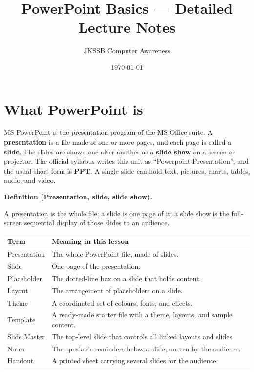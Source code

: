 \documentclass[11pt]{article}
\title{PowerPoint Basics --- Detailed Lecture Notes}
\author{JKSSB Computer Awareness}
\date{\today}
\newenvironment{definitionbox}[1]{%
  \par\noindent\textbf{Definition (#1).}\ \itshape
}{\par\vspace{0.3em}}
\begin{document}
\maketitle

\section{What PowerPoint is}
MS PowerPoint is the presentation program of the MS Office suite. A
\textbf{presentation} is a file made of one or more pages, and each page is
called a \textbf{slide}. The slides are shown one after another as a
\textbf{slide show} on a screen or projector. The official syllabus writes
this unit as ``Powerpoint Presentation'', and the usual short form is
\textbf{PPT}. A single slide can hold text, pictures, charts, tables, audio,
and video.

\begin{definitionbox}{Presentation, slide, slide show}
A presentation is the whole file; a slide is one page of it; a slide show is
the full-screen sequential display of those slides to an audience.
\end{definitionbox}

\begin{center}
\begin{tabular}{p{}p{}}
\toprule
\textbf{Term} & \textbf{Meaning in this lesson} \\
\midrule
Presentation & The whole PowerPoint file, made of slides. \\
Slide & One page of the presentation. \\
Placeholder & The dotted-line box on a slide that holds content. \\
Layout & The arrangement of placeholders on a slide. \\
Theme & A coordinated set of colours, fonts, and effects. \\
Template & A ready-made starter file with a theme, layouts, and sample content. \\
Slide Master & The top-level slide that controls all linked layouts and slides. \\
Notes & The speaker's reminders below a slide, unseen by the audience. \\
Handout & A printed sheet carrying several slides for the audience. \\
\bottomrule
\end{tabular}
\end{center}
\end{document}
